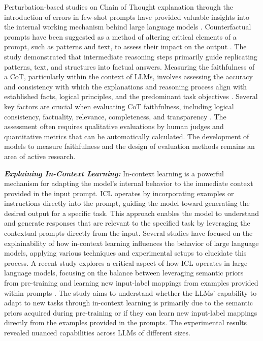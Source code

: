 \documentclass[final,5p,times,twocolumn]{elsarticle}
\begin{document}
Perturbation-based studies on Chain of Thought explanation through the introduction of errors in few-shot prompts have provided valuable insights into the internal working mechanism behind large language models \cite{madaan2022text, wang2022towards}. Counterfactual prompts have been suggested as a method of altering critical elements of a prompt, such as patterns and text, to assess their impact on the output \cite{madaan2022text}. The study demonstrated that intermediate reasoning steps primarily guide replicating patterns, text, and structures into factual answers. 
Measuring the faithfulness of a CoT, particularly within the context of LLMs, involves assessing the accuracy and consistency with which the explanations and reasoning process align with established facts, logical principles, and the predominant task objectives \cite{lanham2023measuring}. Several key factors are crucial when evaluating CoT faithfulness, including logical consistency, factuality, relevance, completeness, and transparency \cite{lanham2023measuring}. The assessment often requires qualitative evaluations by human judges and quantitative metrics that can be automatically calculated. The development of models to measure faithfulness and the design of evaluation methods remains an area of active research.


\textbf{\textit{Explaining In-Context Learning:}}
In-context learning is a powerful mechanism for adapting the model's internal behavior to the immediate context provided in the input prompt. ICL operates by incorporating examples or instructions directly into the prompt, guiding the model toward generating the desired output for a specific task. This approach enables the model to understand and generate responses that are relevant to the specified task by leveraging the contextual prompts directly from the input. Several studies have focused on the explainability of how in-context learning influences the behavior of large language models, applying various techniques and experimental setups to elucidate this process. A recent study explores a critical aspect of how ICL operates in large language models, focusing on the balance between leveraging semantic priors from pre-training and learning new input-label mappings from examples provided within prompts \cite{wei2023larger}. The study aims to understand whether the LLMs' capability to adapt to new tasks through in-context learning is primarily due to the semantic priors acquired during pre-training or if they can learn new input-label mappings directly from the examples provided in the prompts. The experimental results revealed nuanced capabilities across LLMs of different sizes.
\end{document}
